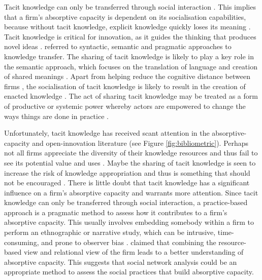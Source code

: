 Tacit knowledge can only be transferred through social interaction \citep{nonaka1995knowledge,nonaka2009perspective}. This implies that a firm's absorptive capacity is dependent on its socialisation capabilities, because without tacit knowledge, explicit knowledge quickly loses its meaning \citep{jansen2005managing,gertler2003tacit,seidler2008use}. Tacit knowledge is critical for innovation, as it guides the thinking that produces novel ideas \citep{leonard1998role,amar2008descriptive}. \citet{easterby2008absorptive} referred to syntactic, semantic and pragmatic approaches to knowledge transfer. The sharing of tacit knowledge is likely to play a key role in the semantic approach, which focuses on the translation of language and creation of shared meanings \citep{carlile2004transferring}. Apart from helping reduce the cognitive distance between firms \citep{nooteboom2000learning}, the socialisation of tacit knowledge is likely to result in the creation of enacted knowledge \citep{nonaka1995knowledge,todorova2007absorptive,marabelli2014knowing}. The act of sharing tacit knowledge may be treated as a form of productive or systemic power whereby actors are empowered to change the ways things are done in practice \citep{easterby2008absorptive,marabelli2014knowing}.\medskip

Unfortunately, tacit knowledge has received scant attention in the absorptive-capacity and open-innovation literature (see Figure \ref{fig:bibliometric}). Perhaps not all firms appreciate the diversity of their knowledge resources and thus fail to see its potential value and uses \citep{nonaka1994dynamic}. Maybe the sharing of tacit knowledge is seen to increase the risk of knowledge appropriation and thus is something that should not be encouraged \citep{roper2013externalities,laursen2014paradox}. There is little doubt that tacit knowledge has a significant influence on a firm's absorptive capacity and warrants more attention. Since tacit knowledge can only be transferred through social interaction, a practice-based approach is a pragmatic method to assess how it contributes to a firm's absorptive capacity. This usually involves embedding somebody within a firm to perform an ethnographic or narrative study, which can be intrusive, time-consuming, and prone to observer bias \citep{goodson2011overview}. \citet{vanhaverbeke2007connecting} claimed that combining the resource-based view \citep{wernerfelt1984resource} and relational view of the firm \citep{dyer1998relational} leads to a better understanding of absorptive capacity. This suggests that social network analysis could be an appropriate method to assess the social practices that build absorptive capacity.\medskip

